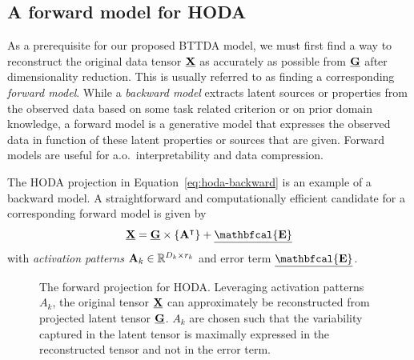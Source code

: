 \documentclass[twocolumn]{article}
\begin{document}
\subsection{A forward model for \textsc{HODA}}
As a prerequisite for our proposed \textsc{BTTDA} model, we must first find a
way to reconstruct the original data tensor $\underline{\mathbf{X}}$ as accurately as possible
from $\underline{\mathbf{G}}$ after dimensionality reduction.
This is usually referred to as finding a corresponding \emph{forward model}.
While a \emph{backward model} extracts latent sources or properties from the observed
data based on some task related criterion or on prior domain knowledge,
a forward model is a generative model that expresses the observed data in
function of these latent properties or sources that are given.
Forward models are useful for a.o.\ interpretability and data compression.

The \textsc{HODA} projection in Equation~\ref{eq:hoda-backward} is an example
of a backward model.
A straightforward and computationally efficient candidate for a corresponding
forward model is given by
\begin{equation}
	\ten{X} = \ten{G}\mmpr{\mat{A}^\intercal} + \ten{\mathbfcal{E}}
	\label{eq:HODA-forward}
\end{equation}
with \emph{activation patterns} $\mathbf{A}_k \in \mathbb{R}^{D_k\times r_k}$
and error term $\ten{\mathbfcal{E}}$.
\begin{figure}[t]
	\centering
	
	\caption{The forward projection for \textsc{HODA}. Leveraging activation
		patterns $A_k$, the original tensor $\underline{\mathbf{X}}$ can approximately be
		reconstructed from projected latent tensor $\underline{\mathbf{G}}$. $A_k$ are chosen such
		that the variability captured in the latent tensor is maximally expressed in
		the reconstructed tensor and not in the error term.}
	\label{fig:HODA-forward}
\end{figure}
\end{document}
